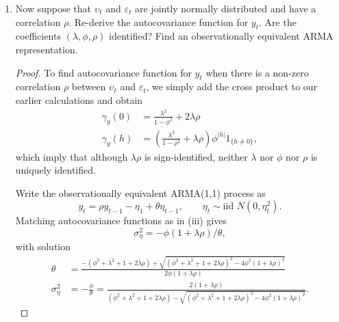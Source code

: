 \documentclass[oneside,reqno]{amsart}
\newcommand{\eps}{\varepsilon}
\newcommand{\ups}{\upsilon}
\theoremstyle{definition}
\begin{document}
\begin{enumerate}
\begin{proof}
\begin{align*}
	-\phi(1 + 2 \theta\phi + \theta^2 ) &= \theta - \theta \phi^2 + \theta \lambda^2
\end{align*}
or 
\[
	\phi \theta^2 + \theta(\phi^2 + \lambda^2 + 1) + \phi = 0
\]
This quadratic equation in $\theta$ has two solutions given by
\[
	\theta = \frac{-(\phi^2 + \lambda^2 + 1) \pm \sqrt{(\phi^2 + \lambda^2 + 1)^2 - 4 \phi^2}}{2 \phi}
\]
To obtain a single solution, we can require that the ARMA(1,1) process is invertible (i.e., $|\theta| < 1$): 
\begin{align*}
	\theta &= \frac{-(\phi^2 + \lambda^2 + 1) + \sqrt{(\phi^2 + \lambda^2 + 1)^2 - 4 \phi^2}}{2 \phi} \\
	\sigma_\eta^2 &= -\frac{\phi}{\theta} = \frac{2}{(\phi^2 + \lambda^2 + 1) - \sqrt{(\phi^2 + \lambda^2 + 1) - 4 \phi^2}}.
\end{align*}
\end{proof}


\item
Now suppose that $\ups_t$ and $\eps_t$ are jointly normally distributed and have a correlation $\rho$. Re-derive the autocovariance function for $y_t$. Are the coefficients $(\lambda, \phi, \rho)$ identified? Find an observationally equivalent ARMA representation.

\begin{proof}
To find autocovariance function for $y_t$ when there is a non-zero correlation $\rho$ between $\ups_t$ and $\eps_t$, we simply add the cross product to our earlier calculations and obtain 
\begin{align*}
	\gamma_y(0) &= \frac{\lambda^2}{1-\phi^2} + 2 \lambda \rho \\
	\gamma_y(h) &=  \left(\frac{\lambda^2}{1-\rho^2} + \lambda \rho \right)\phi^{|h|}  1_{\{h \neq 0\}},
\end{align*}
which imply that although $\lambda \rho$ is sign-identified, neither $\lambda$ nor $\phi$ nor $\rho$ is uniquely identified. 
\par
Write the observationally equivalent ARMA(1,1) process as
\[
	y_t = \rho y_{t-1} -\eta_1 + \theta \eta_{t-1},
	\qquad \eta_t \sim \text{iid } N(0, \eta_t^2).
\]
Matching autocovariance functions as in (iii) gives
\[
	\sigma_\eta^2 = - \phi(1 + \lambda \rho)/\theta,
\]
with solution 
\begin{align*}
	\theta &= \frac{-(\phi^2 + \lambda^2 + 1 + 2 \lambda \rho) + \sqrt{(\phi^2 + \lambda^2 + 1 + 2 \lambda \rho)^2 - 4 \phi^2 (1 + \lambda \rho)^2}}{2 \phi (1 + \lambda \rho)} \\
	\sigma_\eta^2 &= -\frac{\phi}{\theta} = \frac{2 (1 + \lambda \rho)}{(\phi^2 + \lambda^2 + 1 + 2 \lambda \rho) - \sqrt{(\phi^2 + \lambda^2 + 1 + 2 \lambda \rho)^2 - 4 \phi^2 (1 + \lambda \rho)^2}}.
\end{align*}
\end{proof}


\end{enumerate}
\end{document}
